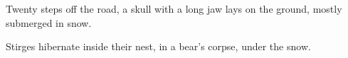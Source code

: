 \begin{boxtext}
  Twenty \glspl{step} off the road, a skull with a long jaw lays on the ground, mostly submerged in \gls{snow}.
\end{boxtext}
\label{\jobname:harvestStirge}
Stirges hibernate inside their nest, in a bear's corpse, under the \gls{snow}.

